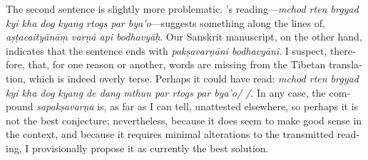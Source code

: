 \documentclass[naipra.tex]{subfiles}
\begin{document}
\begin{sanskrit}
{\begin{english}
	The second sentence is slightly more problematic. \TIB 's reading—\emph{mchod rten brgyad kyi kha dog kyang rtogs par bya'o}—suggests something along the lines of, \emph{aṣṭacaityānāṃ varṇā api bodhavyāḥ}.
	Our Sanskrit manuscript, on the other hand, indicates that the sentence ends with \emph{pakṣavarṇāni bodhavyāni}.
	I suspect, therefore, that, for one reason or another, words are missing from the Tibetan translation, which is indeed overly terse.
	Perhaps it could have read: \emph{mchod rten brgyad kyi kha dog kyang de dang mthun par rtogs par bya'o/ /}.
	In any case, the compound \emph{sapakṣavarṇa} is, as far as I can tell, unattested elsewhere, so perhaps it is not the best conjecture; nevertheless, because it does seem to make good sense in the context, and because it requires minimal alterations to the transmitted reading, I provisionally propose it as currently the best solution. 
\end{english}}
\pend



\end{sanskrit}
\end{document}
